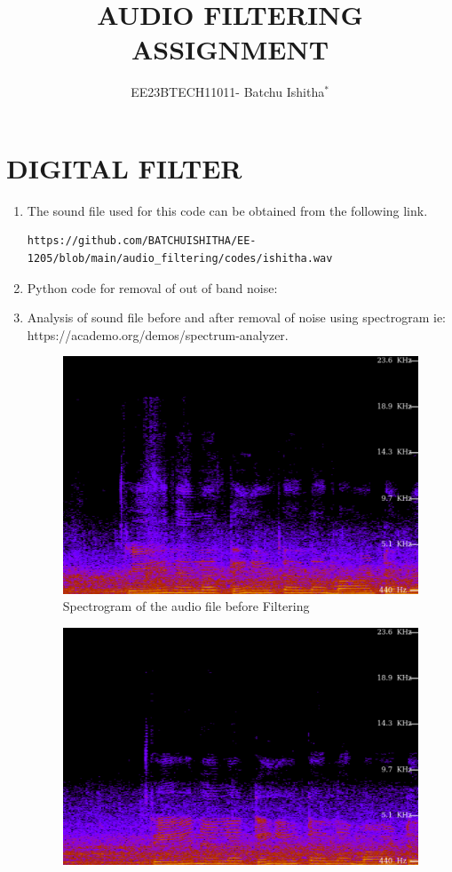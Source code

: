 \documentclass[journal,12pt,twocolumn]{IEEEtran}
\theoremstyle{remark}
\begin{document}

\title{ AUDIO FILTERING ASSIGNMENT}
\author{EE23BTECH11011- Batchu Ishitha$^{*}$%
}
\maketitle

\bigskip

\renewcommand{\thefigure}{\theenumi}
\renewcommand{\thetable}{\theenumi}

\section{DIGITAL FILTER}
\begin{enumerate}[label=\thesection\arabic*.,ref=\thesection.\theenumi]
\item The sound file used for this code can be obtained from the following link.
\begin{lstlisting}
https://github.com/BATCHUISHITHA/EE-1205/blob/main/audio_filtering/codes/ishitha.wav
\end{lstlisting}
\item Python code for removal of out of band noise:
  \label{1.2}
\item Analysis of sound file before and after removal of noise using spectrogram ie: https://academo.org/demos/spectrum-analyzer.
\begin{figure}[ht]
    \includegraphics[width=0.8\columnwidth]{figs/beforefiltering.png }
    \caption{Spectrogram of the audio file before Filtering}
    \label{fig:beforefiltering}
\end{figure}
\begin{figure}[ht]
    \includegraphics[width=0.8\columnwidth]{figs/afterfiltering.png}

\end{figure}
\end{enumerate}
\end{document}

